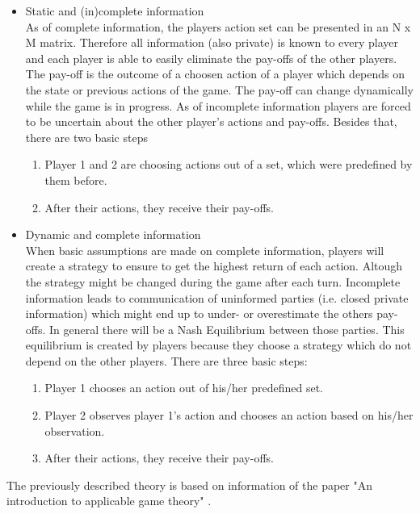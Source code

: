 \begin{itemize}
	\item Static and (in)complete information\\
	As of complete information, the players action set can be presented in an N x M matrix.
	Therefore all information (also private) is known to every player and each player is able to easily eliminate the pay-offs of the 		
	other players. The pay-off is the outcome of a choosen action of a player which depends on the state or previous actions of 
	the game. The pay-off can change dynamically while the game is in progress.
	As of incomplete information players are forced to be uncertain about the other player's actions and pay-offs.
	Besides that, there are two basic steps
	\begin{enumerate}
		\item Player 1 and 2 are choosing actions out of a set, which were predefined by them before.
		\item After their actions, they receive their pay-offs.
	\end{enumerate}
	\item Dynamic and complete information\\
	When basic assumptions are made on complete information, players will create a strategy to ensure to get the highest return 		
	of each action. Altough the strategy might be changed during the game after each turn.
	Incomplete information leads to communication of uninformed parties (i.e. closed private 
	information) which might end up to under- or overestimate the others pay-offs. In general there will be a Nash Equilibrium 
	between those parties. This equilibrium is created by players because they choose a strategy which do not depend on the other 	players. There are three basic steps: 
	\begin{enumerate}
		\item Player 1 chooses an action out of his/her predefined set.
		\item Player 2 observes player 1's action and chooses an action based on his/her observation.
		\item After their actions, they receive their pay-offs.
	\end{enumerate}
\end{itemize}

The previously described theory is based on information of the paper "An introduction to applicable game theory" \cite {gibbons1997gametheory}.

